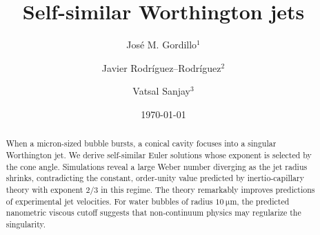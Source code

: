 \documentclass[aps,prl,reprint,floatfix]{revtex4-2}
\begin{document}
\raggedbottom

\title{Self-similar Worthington jets}

\author{Jos\'e M. Gordillo$^{1}$}
\author{Javier Rodr\'iguez--Rodr\'{i}guez$^{2}$}
\author{Vatsal Sanjay$^{3}$}

\date{\today}

\begin{abstract}

When a micron-sized bubble bursts, a conical cavity focuses into a singular Worthington jet. We derive self-similar Euler solutions whose exponent is selected by the cone angle. Simulations reveal a large Weber number diverging as the jet radius shrinks, contradicting the constant, order-unity value predicted by inertio-capillary theory with exponent $2/3$ in this regime. The theory remarkably improves predictions of experimental jet velocities. For water bubbles of radius $\SI{10}{\micro\meter}$, the predicted nanometric viscous cutoff suggests that non-continuum physics may regularize the singularity.

\end{abstract}

\maketitle
\end{document}

